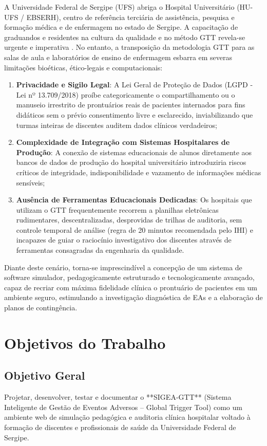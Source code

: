 A Universidade Federal de Sergipe (UFS) abriga o Hospital Universitário (HU-UFS / EBSERH), centro de referência terciária de assistência, pesquisa e formação médica e de enfermagem no estado de Sergipe. A capacitação de graduandos e residentes na cultura da qualidade e no método GTT revela-se urgente e imperativa \cite{patricio2021seguranca}. No entanto, a transposição da metodologia GTT para as salas de aula e laboratórios de ensino de enfermagem esbarra em severas limitações bioéticas, ético-legais e computacionais:
\begin{enumerate}
    \item \textbf{Privacidade e Sigilo Legal}: A Lei Geral de Proteção de Dados (LGPD - Lei nº 13.709/2018) proíbe categoricamente o compartilhamento ou o manuseio irrestrito de prontuários reais de pacientes internados para fins didáticos sem o prévio consentimento livre e esclarecido, inviabilizando que turmas inteiras de discentes auditem dados clínicos verdadeiros;
    \item \textbf{Complexidade de Integração com Sistemas Hospitalares de Produção}: A conexão de sistemas educacionais de alunos diretamente aos bancos de dados de produção do hospital universitário introduziria riscos críticos de integridade, indisponibilidade e vazamento de informações médicas sensíveis;
    \item \textbf{Ausência de Ferramentas Educacionais Dedicadas}: Os hospitais que utilizam o GTT frequentemente recorrem a planilhas eletrônicas rudimentares, descentralizadas, desprovidas de trilhas de auditoria, sem controle temporal de análise (regra de 20 minutos recomendada pelo IHI) e incapazes de guiar o raciocínio investigativo dos discentes através de ferramentas consagradas da engenharia da qualidade.
\end{enumerate}

Diante deste cenário, torna-se imprescindível a concepção de um sistema de software simulador, pedagogicamente estruturado e tecnologicamente avançado, capaz de recriar com máxima fidelidade clínica o prontuário de pacientes em um ambiente seguro, estimulando a investigação diagnóstica de EAs e a elaboração de planos de contingência.

\section{Objetivos do Trabalho}
\label{sec_objetivos}

\subsection{Objetivo Geral}
Projetar, desenvolver, testar e documentar o **SIGEA-GTT** (Sistema Inteligente de Gestão de Eventos Adversos – Global Trigger Tool) como um ambiente web de simulação pedagógica e auditoria clínica hospitalar voltado à formação de discentes e profissionais de saúde da Universidade Federal de Sergipe.

